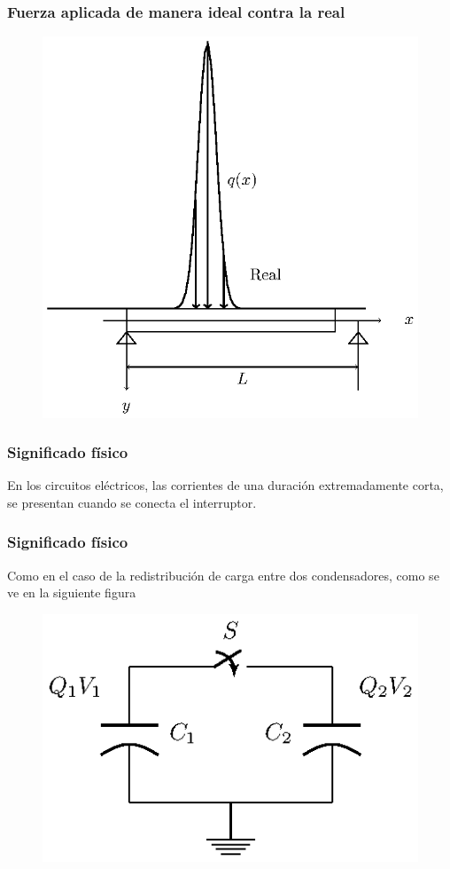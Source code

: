 \documentclass[12pt]{beamer}
\begin{document}
\begin{frame}
\frametitle{Fuerza aplicada de manera ideal contra la real}
\vspace*{-0.5cm}
\begin{figure}[H]
    \centering
    \includegraphics[scale=0.85]{Imagenes/delta_Dirac_02b.eps}
\end{figure}
\end{frame}
\begin{frame}
\frametitle{Significado físico}
En los circuitos eléctricos, las corrientes  de una duración extremadamente corta, se presentan cuando se conecta el interruptor.
\end{frame}
\begin{frame}
\frametitle{Significado físico}
Como en el caso de la redistribución de carga entre dos condensadores, como se ve en la siguiente figura%
\begin{figure}[H]
    \centering
    \includegraphics[scale=1.25]{Imagenes/delta_Dirac_03.eps}
\end{figure}
\end{frame}
\end{document}
